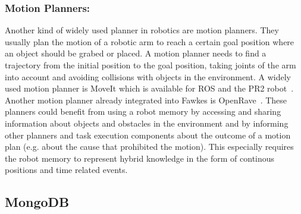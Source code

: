 \documentclass[a4paper,11pt]{article}
\begin{document}
\subsubsection{Motion Planners:}
Another kind of widely used planner in robotics are motion
planners. They usually plan the motion of a robotic arm to reach a
certain goal position where an object should be grabed or placed. A
motion planner needs to find a trajectory from the initial position to
the goal position, taking joints of the arm into account and avoiding
collisions with objects in the environment. A widely used motion
planner is MoveIt which is available for ROS and the PR2
robot~\cite{MoveIt}. Another motion planner already integrated into
Fawkes is OpenRave~\cite{OpenRave}. These planners could benefit from
using a robot memory by accessing and sharing information about
objects and obstacles in the environment and by informing other
planners and task execution components about the outcome of a motion
plan (e.g. about the cause that prohibited the motion). This
especially requires the robot memory to represent hybrid knowledge in
the form of continous positions and time related events.

\subsection{MongoDB}
\label{sec:mongodb}
\end{document}
